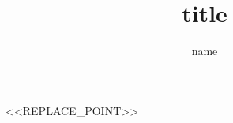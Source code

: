 \documentclass[11pt]{jarticle}
\title{title}
\author{name}
\begin{document}
\maketitle


<<REPLACE_POINT>>


\begin{thebibliography}{9}
\end{thebibliography}
\end{document}
